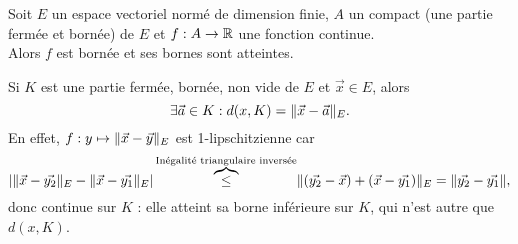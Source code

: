 \documentclass{book}
\begin{document}
\begin{Theoreme}
Soit $E$ un espace vectoriel normé de dimension finie, $A$ un compact (une partie fermée et bornée) de $E$ et $f:A\to\mathbb{R}$ une fonction continue.\\
Alors $f$ est bornée et ses bornes sont atteintes.
\end{Theoreme}
\begin{Exemple}
Si $K$ est une partie fermée, bornée, non vide de $E$ et $\vec{x} \in E$, alors
$$\exists \vec{a}  \in K:  d (x, K) = \mathopen\lVert \vec{x} - \vec{a} \mathclose\rVert_E.$$
En effet, $f : y \mapsto \mathopen\lVert \vec{x} - \vec{y} \mathclose\rVert_E$ est 1-lipschitzienne car 
$$\left|\mathopen\lVert \vec{x} - \vec{y_2} \mathclose\rVert_E -\mathopen\lVert \vec{x} - \vec{y_1} \mathclose\rVert_E\right| \overbrace{\leq}^{\text{Inégalité triangulaire inversée}} \mathopen\lVert (\vec{y_2} - \vec{x})  + (\vec{x} - \vec{y_1}) \mathclose\rVert_E=\mathopen\lVert \vec{y_2} - \vec{y_1} \mathclose\rVert,$$
donc continue sur $K$ : elle atteint sa borne inférieure sur
$K$, qui n'est autre que $d (x, K)$.
\end{Exemple}
\end{document}
